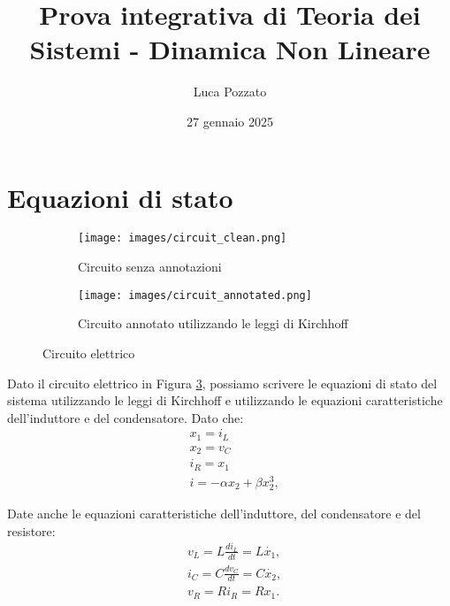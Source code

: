\documentclass{article}
\begin{document}
\title{Prova integrativa di Teoria dei Sistemi - Dinamica Non Lineare}
\author{Luca Pozzato}
\date{27 gennaio 2025}

\maketitle
\vspace{15em}
\tableofcontents

\newpage

\section{Equazioni di stato}

\begin{figure}[ht]
    \centering
    \begin{subfigure}{0.50\textwidth}
        \texttt{[image: images/circuit\_clean.png]}
        \caption{Circuito senza annotazioni}
        \label{fig:circuito_clean}
    \end{subfigure}
    \hfill
    \begin{subfigure}{0.65\textwidth}
        \texttt{[image: images/circuit\_annotated.png]}
        \caption{Circuito annotato utilizzando le leggi di Kirchhoff}
        \label{fig:circuito_annotato}
    \end{subfigure}
    \caption{Circuito elettrico}
    \label{fig:side_by_side}
\end{figure}

Dato il circuito elettrico in Figura \ref{fig:side_by_side}, possiamo scrivere le equazioni di stato del sistema utilizzando le leggi di Kirchhoff e utilizzando le equazioni caratteristiche dell'induttore e del condensatore. Dato che:
\begin{align*}
     & x_1 = i_L                        \\
     & x_2 = v_C                        \\
     & i_R = x_1                        \\
     & i   = -\alpha x_2 + \beta x_2^3,
\end{align*}

Date anche le equazioni caratteristiche dell'induttore, del condensatore e del resistore:
\begin{align*}
     & v_L = L \frac{di_L}{dt} = L \dot{x_1}, \\
     & i_C = C \frac{dv_C}{dt} = C \dot{x_2}, \\
     & v_R = R i_R = R x_1.
\end{align*}
\end{document}
